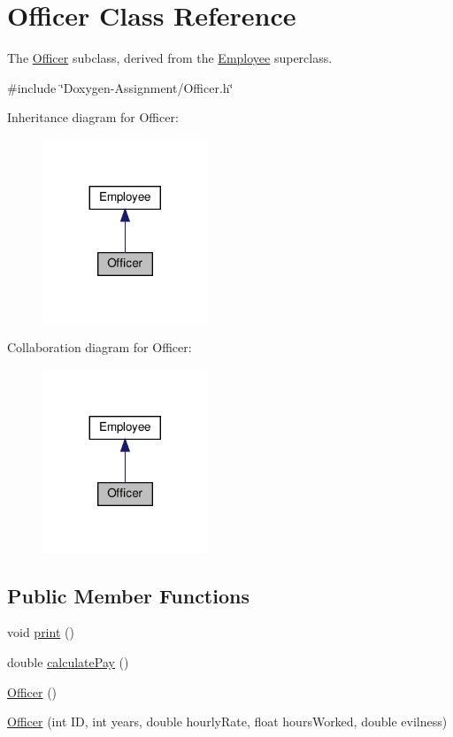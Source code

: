 \hypertarget{classOfficer}{}\section{Officer Class Reference}
\label{classOfficer}


The \hyperlink{classOfficer}{Officer} subclass, derived from the \hyperlink{classEmployee}{Employee} superclass.  




{\ttfamily \#include \char`\"{}Doxygen-\/\+Assignment/\+Officer.\+h\char`\"{}}



Inheritance diagram for Officer\+:
\nopagebreak
\begin{figure}[H]
\begin{center}
\leavevmode
\includegraphics[width=140pt]{classOfficer__inherit__graph}
\end{center}
\end{figure}


Collaboration diagram for Officer\+:
\nopagebreak
\begin{figure}[H]
\begin{center}
\leavevmode
\includegraphics[width=140pt]{classOfficer__coll__graph}
\end{center}
\end{figure}
\subsection*{Public Member Functions}
\begin{DoxyCompactItemize}
\item 
void \hyperlink{classOfficer_aeadece05a1a0b7fb29bd412830d2e07a}{print} ()
\item 
double \hyperlink{classOfficer_a1fa1aad39b9e95be7a088990ebf17059}{calculate\+Pay} ()
\item 
\hyperlink{classOfficer_a80ac1e36a3f36c3a7e12b5dc9320ad89}{Officer} ()
\item 
\hyperlink{classOfficer_ac75c45d6e8628606278cb4ce6596f67f}{Officer} (int ID, int years, double hourly\+Rate, float hours\+Worked, double evilness)
\end{DoxyCompactItemize}
